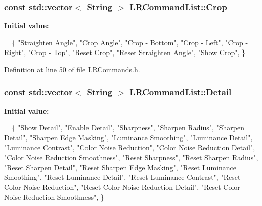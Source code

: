\subsubsection[{\texorpdfstring{Crop}{Crop}}]{\setlength{\rightskip}{0pt plus 5cm}const std\+::vector$<$ String $>$ L\+R\+Command\+List\+::\+Crop\hspace{0.3cm}{\ttfamily [static]}}\hypertarget{class_l_r_command_list_af9b40cf46ccb927ac3fcc425b31f7cfc}{}\label{class_l_r_command_list_af9b40cf46ccb927ac3fcc425b31f7cfc}
{\bfseries Initial value\+:}
\begin{DoxyCode}
= \{
    \textcolor{stringliteral}{"Straighten Angle"},
    \textcolor{stringliteral}{"Crop Angle"},
    \textcolor{stringliteral}{"Crop - Bottom"},
    \textcolor{stringliteral}{"Crop - Left"},
    \textcolor{stringliteral}{"Crop - Right"},
    \textcolor{stringliteral}{"Crop - Top"},
    \textcolor{stringliteral}{"Reset Crop"},
    \textcolor{stringliteral}{"Reset Straighten Angle"},
    \textcolor{stringliteral}{"Show Crop"},
\}
\end{DoxyCode}


Definition at line 50 of file L\+R\+Commands.\+h.

\subsubsection[{\texorpdfstring{Detail}{Detail}}]{\setlength{\rightskip}{0pt plus 5cm}const std\+::vector$<$ String $>$ L\+R\+Command\+List\+::\+Detail\hspace{0.3cm}{\ttfamily [static]}}\hypertarget{class_l_r_command_list_a98efe40a029f1aae7d26915115bea481}{}\label{class_l_r_command_list_a98efe40a029f1aae7d26915115bea481}
{\bfseries Initial value\+:}
\begin{DoxyCode}
= \{
    \textcolor{stringliteral}{"Show Detail"},
    \textcolor{stringliteral}{"Enable Detail"},
    \textcolor{stringliteral}{"Sharpness"},
    \textcolor{stringliteral}{"Sharpen Radius"},
    \textcolor{stringliteral}{"Sharpen Detail"},
    \textcolor{stringliteral}{"Sharpen Edge Masking"},
    \textcolor{stringliteral}{"Luminance Smoothing"},
    \textcolor{stringliteral}{"Luminance Detail"},
    \textcolor{stringliteral}{"Luminance Contrast"},
    \textcolor{stringliteral}{"Color Noise Reduction"},
    \textcolor{stringliteral}{"Color Noise Reduction Detail"},
    \textcolor{stringliteral}{"Color Noise Reduction Smoothness"},
    \textcolor{stringliteral}{"Reset Sharpness"},
    \textcolor{stringliteral}{"Reset Sharpen Radius"},
    \textcolor{stringliteral}{"Reset Sharpen Detail"},
    \textcolor{stringliteral}{"Reset Sharpen Edge Masking"},
    \textcolor{stringliteral}{"Reset Luminance Smoothing"},
    \textcolor{stringliteral}{"Reset Luminance Detail"},
    \textcolor{stringliteral}{"Reset Luminance Contrast"},
    \textcolor{stringliteral}{"Reset Color Noise Reduction"},
    \textcolor{stringliteral}{"Reset Color Noise Reduction Detail"},
    \textcolor{stringliteral}{"Reset Color Noise Reduction Smoothness"},
\}
\end{DoxyCode}


